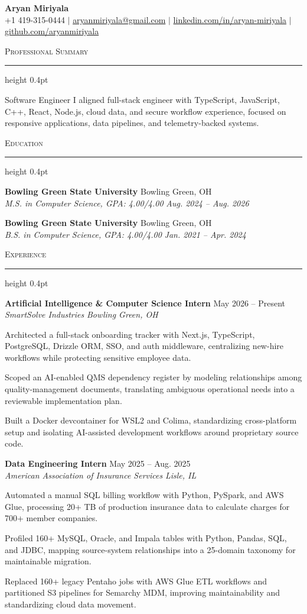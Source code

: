 \documentclass[letterpaper,11pt]{article}
\newcommand{\resumesection}[1]{%
  \par\vspace{2pt}%
  {\large\scshape #1}\par\vspace{2pt}%
  \hrule height 0.4pt\vspace{2pt}%
}
\newcommand{\resumeSubheading}[4]{
  \textbf{#1} \hfill #2\\
  \textit{#3} \hfill \textit{#4}
}
\begin{document}
\begin{center}
  {\LARGE \textbf{Aryan Miriyala}}\\[-1pt]
  \small
  +1 419-315-0444 $|$
  \href{mailto:aryanmiriyala@gmail.com}{aryanmiriyala@gmail.com} $|$
  \href{https://www.linkedin.com/in/aryan-miriyala-7788a21b6/}{linkedin.com/in/aryan-miriyala} $|$
  \href{https://github.com/aryanmiriyala}{github.com/aryanmiriyala}
\end{center}\vspace{-10pt}

\resumesection{Professional Summary}
Software Engineer I aligned full-stack engineer with TypeScript, JavaScript, C++, React, Node.js, cloud data, and secure workflow experience, focused on responsive applications, data pipelines, and telemetry-backed systems.

\resumesection{Education}
\resumeSubheading
{Bowling Green State University}{Bowling Green, OH}
{M.S. in Computer Science, GPA: 4.00/4.00}{Aug. 2024 -- Aug. 2026}

\resumeSubheading
{Bowling Green State University}{Bowling Green, OH}
{B.S. in Computer Science, GPA: 4.00/4.00}{Jan. 2021 -- Apr. 2024}

\resumesection{Experience}
\resumeSubheading
{Artificial Intelligence \& Computer Science Intern}{May 2026 -- Present}
{SmartSolve Industries}{Bowling Green, OH}
\begin{tightitemize}
  \item Architected a full-stack onboarding tracker with Next.js, TypeScript, PostgreSQL, Drizzle ORM, SSO, and auth middleware, centralizing new-hire workflows while protecting sensitive employee data.
  \item Scoped an AI-enabled QMS dependency register by modeling relationships among quality-management documents, translating ambiguous operational needs into a reviewable implementation plan.
  \item Built a Docker devcontainer for WSL2 and Colima, standardizing cross-platform setup and isolating AI-assisted development workflows around proprietary source code.
\end{tightitemize}

\resumeSubheading
{Data Engineering Intern}{May 2025 -- Aug. 2025}
{American Association of Insurance Services}{Lisle, IL}
\begin{tightitemize}
  \item Automated a manual SQL billing workflow with Python, PySpark, and AWS Glue, processing 20+ TB of production insurance data to calculate charges for 700+ member companies.
  \item Profiled 160+ MySQL, Oracle, and Impala tables with Python, Pandas, SQL, and JDBC, mapping source-system relationships into a 25-domain taxonomy for maintainable migration.
  \item Replaced 160+ legacy Pentaho jobs with AWS Glue ETL workflows and partitioned S3 pipelines for Semarchy MDM, improving maintainability and standardizing cloud data movement.
\end{tightitemize}
\end{document}
